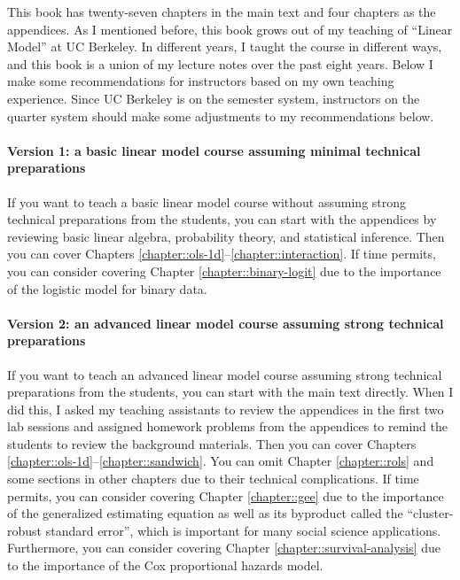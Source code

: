 This book has twenty-seven chapters in the main text and four chapters as the appendices. As I mentioned before, this book grows out of my teaching of ``Linear Model'' at UC Berkeley. In different years, I taught the course in different ways, and this book is a union of my lecture notes over the past eight years. Below I make some recommendations for instructors based on my own teaching experience. Since UC Berkeley is on the semester system, instructors on the quarter system should make some adjustments to my recommendations below.



\paragraph*{Version 1: a basic linear model course assuming minimal technical preparations}
If you want to teach a basic linear model course without assuming strong technical preparations from the students, you can start with the appendices by reviewing basic linear algebra, probability theory, and statistical inference. Then you can cover Chapters \ref{chapter::ols-1d}--\ref{chapter::interaction}. If time permits, you can consider covering Chapter \ref{chapter::binary-logit} due to the importance of the logistic model for binary data. 


\paragraph*{Version 2: an advanced linear model course assuming strong technical preparations}
If you want to teach an advanced linear model course assuming strong technical preparations from the students, you can start with the main text directly. When I did this, I asked my teaching assistants to review the appendices in the first two lab sessions and assigned homework problems from the appendices to remind the students to review the background materials. Then you can cover Chapters \ref{chapter::ols-1d}--\ref{chapter::sandwich}. You can omit Chapter \ref{chapter::rols} and some sections in other chapters due to their technical complications. If time permits, you can consider covering Chapter \ref{chapter::gee} due to the importance of the generalized estimating equation as well as its byproduct called the ``cluster-robust standard error'', which is important for many social science applications. 
Furthermore, you can consider covering Chapter \ref{chapter::survival-analysis} due to the importance of the Cox proportional hazards model. 


